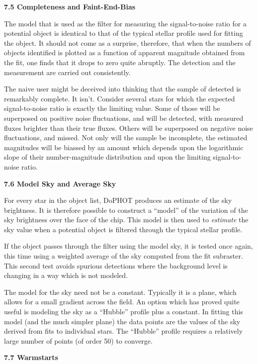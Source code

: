 \centerline{\bf 7.5 Completeness and Faint-End-Bias}

The model that is used as the filter for measuring the
signal-to-noise ratio for a potential object is identical to
that of the typical stellar profile used for fitting the
object.  It should not come as a surprise, therefore, that
when the numbers of objects identified is plotted as a
function of apparent magnitude obtained from the fit, one finds
that it drops to zero quite abruptly.  The detection and the
measurement are carried out consistently.

The naive user might be deceived into thinking that the
sample of detected is remarkably complete.  It isn't.
Consider several stars for which the expected
signal-to-noise ratio is exactly the limiting value.  Some
of those will be superposed on positive noise fluctuations,
and will be detected, with measured fluxes brighter than
their true fluxes.  Others will be superposed on negative
noise fluctuations, and missed.  Not only will the sample be
incomplete, the estimated magnitudes will be biassed by an
amount which depends upon the logarithmic slope of their
number-magnitude distribution and upon the limiting
signal-to-noise ratio.

\centerline{\bf 7.6 Model Sky and Average Sky}

For every star in the object list, DoPHOT produces an
estimate of the sky brightness.  It is therefore
possible to construct a ``model'' of the variation
of the sky brightness over the face of the chip.
This model is then used to {\it estimate} the sky value
when a potential object is filtered through the
typical stellar profile.

If the object passes through the filter using
the model sky, it is tested once again, this time
using a weighted average of the sky computed from
the fit subraster.  This second test avoids spurious
detections where the background level is changing
in a way which is not modeled.

The model for the sky need not be a constant.  Typically
it is a plane, which allows for a small gradient across
the field.  An option which has proved quite useful
is modeling the sky as a ``Hubble'' profile plus a
constant.   In fitting this model (and the much simpler
plane) the data points are the values of the sky derived
from fits to individual stars.  The ``Hubble'' profile
requires a relatively large number of points (of order 50)
to converge.

\centerline{\bf 7.7 Warmstarts}

